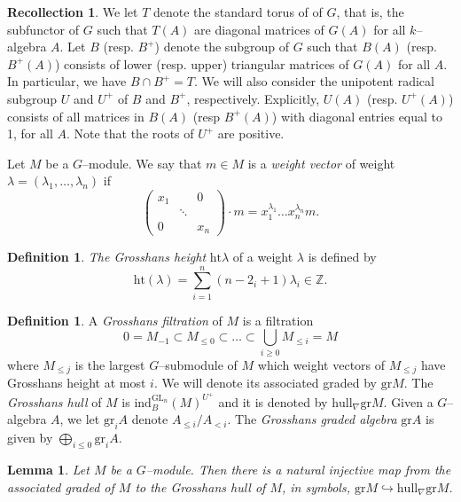 \documentclass{article}
\theoremstyle{plain}
\newtheorem{Lemma}[Th]{Lemma}
\theoremstyle{definition}
\newtheorem{Def}[Th]{Definition}
\newtheorem{Rec}[Th]{Recollection}
\newcommand{\GL}{\mathrm{GL}}
\begin{document}
\begin{Rec}
 We let $T$ denote the standard torus of  of $G$, that is, the subfunctor of $G$ such that $T(A)$ are diagonal matrices of $G(A)$ for all $k$--algebra $A$. Let  $B$ (resp. $B^+$)  denote the subgroup of $G$ such that $B(A)$ (resp. $B^+(A)$) consists of lower (resp. upper) triangular matrices of $G(A)$ for all $A$. In particular, we have $B\cap B^+=T$. We will also consider the unipotent radical subgroup $U$ and $U^+$ of $B$ and $B^+$, respectively. Explicitly, $U(A)$ (resp. $U^+(A)$)  consists of all matrices in $B(A)$ (resp $B^+(A)$) with diagonal entries equal to 1, for all $A$. Note that the roots of $U^+$ are positive. 

Let $M$ be a $G$--module. We say that  $m\in M$ is a \textit{weight vector}  of weight $\lambda=(\lambda_1,\dots,\lambda_n)$ if
    \begin{equation*} 
\begin{pmatrix}
x_1 &  & 0 \\
 & \ddots &  \\
0 &  & x_n
\end{pmatrix} \cdot m=x_1^{\lambda_1}\dots x_n^{\lambda_n}m.
\end{equation*}    
\end{Rec}



\begin{Def}
 \textit{The Grosshans height} $\mathrm{ht} \lambda$ of a weight  $\lambda$ is defined by  
 \[\mathrm{ht}(\lambda)=\sum_{i=1}^{n}(n-2_i+1)\lambda_i\in \mathbb{Z}.\]
\end{Def}


\begin{Def}
    A \textit{Grosshans filtration} of $M$ is a filtration 
    \[0=M_{-1}\subset M_{\leq0}\subset \dots \subset \bigcup_{i\geq0}M_{\leq i}=M\]
    where $M_{\leq j}$ is the largest $G$--submodule of $M$ which weight vectors of $M_{\leq j}$ have Grosshans height at most $i$. We will denote its associated graded by $\mathrm{gr}M$.  The \textit{Grosshans hull} of $M$ is $\mathrm{ind}_B^{\GL_n}(M)^{U^+}$ and it is denoted by $\mathrm{hull}_\nabla \mathrm{gr}M$. Given a $G$--algebra $A$, we let $\mathrm{gr}_i A$ denote $A_{\leq i}/A_{<i}$. The \textit{Grosshans graded algebra} $\mathrm{gr}A$ is given by $\bigoplus_{i\leq 0}\mathrm{gr}_i A$. 
\end{Def}




\begin{Lemma}\label{embedding into grosshans}
    Let $M$ be a $G$--module. Then there is a natural injective map from the associated graded of $M$  to the Grosshans hull of $M$, in symbols,   $\mathrm{gr} M\hookrightarrow \mathrm{hull}_\nabla \mathrm{gr}M$. 
\end{Lemma}
\end{document}
